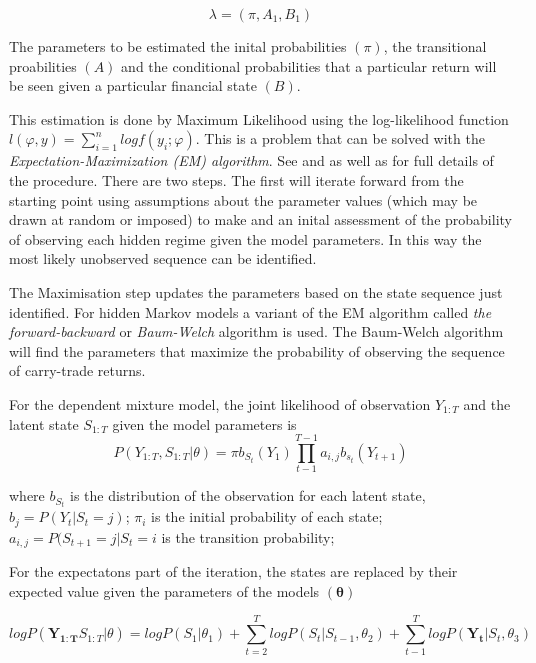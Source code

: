 \documentclass[12pt, a4paper, oneside]{article} %
\begin{document}
\begin{equation}
\lambda = (\pi, A_1, B_1)
\end{equation}

The parameters to be estimated the inital probabilities $(\pi)$, the transitional proabilities $(A)$ and the conditional probabilities that a particular return will be seen given a particular financial state $(B)$. 

This estimation is done by Maximum Likelihood using the log-likelihood function $l(\varphi, y) = \sum_{i=1}^n log f(y_i; \varphi)$. This is a problem that can be solved with the \emph{Expectation-Maximization (EM) algorithm}.  See \citet{dempster1977maximum} and \citet{Hamilton1989} as well as \citet{depmixS4} for full details of the procedure. There are two steps. The first will iterate forward from the starting point using assumptions about the parameter values (which may be drawn at random or imposed) to make and an inital assessment of the probability of observing each hidden regime given the model parameters.  In this way the most likely unobserved sequence can be identified.  

The Maximisation step updates the parameters based on the state sequence just identified. For hidden Markov models a variant of the EM algorithm called \emph{the forward-backward} or \emph{Baum-Welch} algorithm \citet{Baum1970} is used.   The Baum-Welch algorithm will find the parameters that maximize the probability of observing the sequence of carry-trade returns.  

For the dependent mixture model, the joint likelihood of observation $Y_{1:T}$ and the latent state $S_{1:T}$ given the model parameters is 
\begin{equation}
P(Y_{1:T}, S_{1:T}|\theta) = \pi b_{S_t}(Y_1)\prod_{t-1}^{T-1} a_{i,j}b_{s_t}(Y_{t+1})
\end{equation}

where $b_{S_t}$ is the distribution of the observation for each latent state, $b_j = P(Y_t|S_t = j)$; $\pi_i$ is the initial probability of each state; $a_{i,j} = P(S_{t+1} = j| S_t = i$ is the transition probability;  

For the expectatons part of the iteration, the states are replaced by their expected value given the parameters of the models $(\mathbf{\theta})$

\begin{equation} 
log P(\mathbf{Y_{1:T}}S_{1:T}| \theta) = log P(S_1|\theta_1) + \sum_{t=2}^T log P(S_t|S_{t-1}, \theta_2) + \sum_{t-1}^T log P(\mathbf{Y_t}|S_t, \theta_3)
\end{equation}
\end{document}
